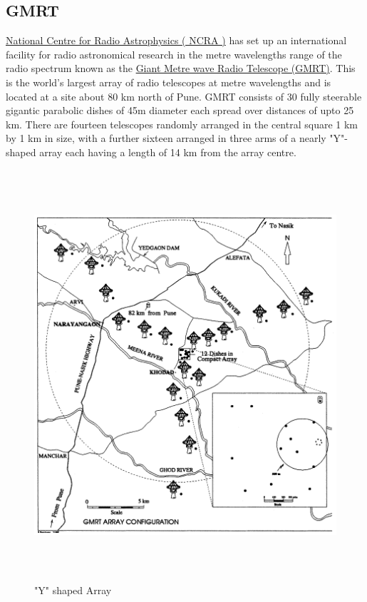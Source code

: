 \subsection{GMRT}
\label{s:radio_gmrt}

\href{http://ncra.tifr.res.in}{National Centre for Radio Astrophysics ( NCRA )} has set up an international facility for radio astronomical research
in the metre wavelengths range of the radio spectrum known as the \href{http://gmrt.ncra.tifr.res.in}{Giant Metre wave Radio Telescope (GMRT)}. This is the
world's largest array of radio telescopes at metre wavelengths and is located at a site about 80 km north of Pune. 
GMRT consists of 30 fully steerable gigantic parabolic dishes of 45m diameter each spread over distances of upto 25 km.
There are fourteen telescopes randomly arranged in the central square 1 km by 1 km in size, with a further sixteen arranged
in three arms of a nearly "Y"-shaped array each having a length of 14 km from the array centre.

\begin{figure}[!htbp]
  \begin{center}
      \includegraphics[height=6in]{figures/yshape}
    \caption{"Y" shaped Array}
    \label{FigYshape}
  \end{center}
\end{figure}

